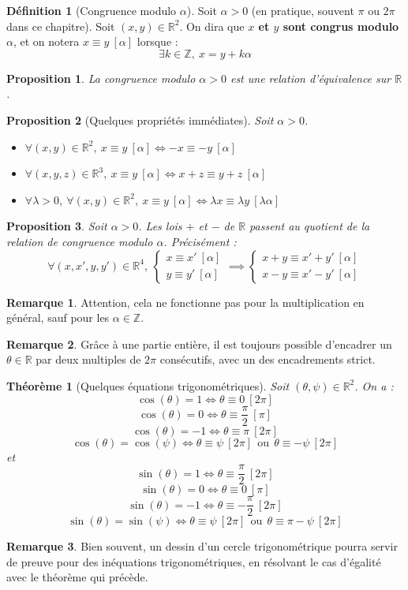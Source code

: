 \documentclass[french]{book}
\newcommand{\Z}{\mathbb{Z}}
\newcommand{\R}{\mathbb{R}}
\theoremstyle{plain}
\newtheorem{thm}{Théorème}[chapter]
\newtheorem{prop}{Proposition}[chapter]
\theoremstyle{definition}
\newtheorem{dfn}{Définition}[chapter]
\newtheorem{rmq}{Remarque}[chapter]
\theoremstyle{remark}
\begin{document}
\begin{dfn}[Congruence modulo $\alpha$]
	Soit $\alpha>0$ (en pratique, souvent $\pi$ ou $2\pi$ dans ce chapitre). Soit $(x,y)\in\R^2$. On dira que \textbf{$x$ et $y$ sont congrus modulo $\alpha$}, et on notera $x\equiv y\ [\alpha]$ lorsque : $$\exists k\in\Z,\ x=y+k\alpha$$
\end{dfn}
\begin{prop}
	La congruence modulo $\alpha>0$ est une relation d'équivalence sur $\R$.
\end{prop}
\begin{prop}[Quelques propriétés immédiates]
	Soit $\alpha>0$.
	\begin{itemize}
		\item $\forall(x,y)\in\R^2,\ x\equiv y\ [\alpha]\iff -x\equiv-y\ [\alpha]$
		\item $\forall(x,y,z)\in\R^3,\ x\equiv y\ [\alpha]\iff x+z\equiv y+z\ [\alpha]$
		\item $\forall \lambda>0,\ \forall(x,y)\in\R^2,\ x\equiv y\ [\alpha]\iff \lambda x\equiv\lambda y\ [\lambda\alpha]$
	\end{itemize}
\end{prop}
\begin{prop}
	Soit $\alpha>0$. Les lois $+$ et $-$ de $\R$ passent au quotient de la relation de congruence modulo $\alpha$. Précisément :
	$$\forall(x,x',y,y')\in\R^4,\ \begin{cases}
		x\equiv x'\ [\alpha] \\
		y\equiv y'\ [\alpha]
	\end{cases} \implies \begin{cases}
		x+y\equiv x'+y'\ [\alpha] \\
		x-y\equiv x'-y'\ [\alpha]
	\end{cases}$$
\end{prop}
\begin{rmq}
	Attention, cela ne fonctionne pas pour la multiplication en général, sauf pour les $\alpha\in\Z$.
\end{rmq}
\begin{rmq}
	Grâce à une partie entière, il est toujours possible d'encadrer un $\theta\in\R$ par deux multiples de $2\pi$ consécutifs, avec un des encadrements strict.
\end{rmq}
\begin{thm}[Quelques équations trigonométriques]
	Soit $(\theta,\psi)\in\R^2$. On a : $$\cos(\theta)=1\iff \theta\equiv 0\ [2\pi]$$ $$\cos(\theta)=0\iff \theta\equiv\displaystyle\frac{\pi}{2}\ [\pi]$$ $$\cos(\theta)=-1\iff \theta\equiv \pi\ [2\pi]$$ $$\cos(\theta)=\cos(\psi)\iff \theta\equiv\psi\ [2\pi] \ \ \text{ou}\ \ \theta\equiv-\psi\ [2\pi]$$ et $$\sin(\theta)=1\iff \theta\equiv \displaystyle\frac{\pi}{2}\ [2\pi]$$ $$\sin(\theta)=0\iff \theta\equiv0\ [\pi]$$ $$\sin(\theta)=-1\iff \theta\equiv\displaystyle-\frac{\pi}{2} \ [2\pi]$$ $$\sin(\theta)=\sin(\psi)\iff \theta\equiv\psi\ [2\pi] \ \ \text{ou}\ \ \theta\equiv\pi-\psi\ [2\pi]$$
\end{thm}
\begin{rmq}
	Bien souvent, un dessin d'un cercle trigonométrique pourra servir de preuve pour des inéquations trigonométriques, en résolvant le cas d'égalité avec le théorème qui précède.
\end{rmq}
\end{document}

